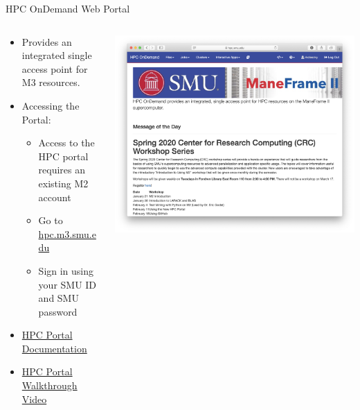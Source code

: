 \begin{frame}{HPC OnDemand Web Portal}
\begin{columns}[c]
\begin{column}{0.5\textwidth}
\begin{itemize}
\item Provides an integrated single access point for M3 resources.
\item Accessing the Portal:
\begin{itemize}
\item Access to the HPC portal requires an existing M2 account
\item Go to \url{hpc.m3.smu.edu}
\item Sign in using your SMU ID and SMU password
\end{itemize}
\item \href{https://southernmethodistuniversity.github.io/hpc_docs/portal.html}{HPC Portal
Documentation}
\item
\href{https://southernmethodistuniversity.github.io/hpc_docs/portal.html}{HPC
Portal Walkthrough Video}
\end{itemize}
\end{column}
\begin{column}{0.5\textwidth}
\includegraphics[width=\linewidth]{figures/portal.png}
\end{column}
\end{columns}
\end{frame}

